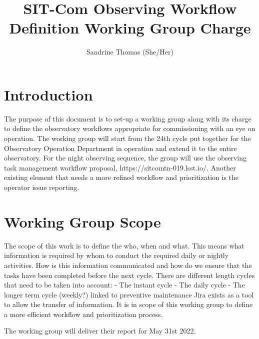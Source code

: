\documentclass[SE,authoryear,toc]{lsstdoc}
\title{SIT-Com Observing Workflow Definition Working Group Charge}
\author{%
Sandrine Thomas (She/Her)
}
\date{\vcsDate}
\begin{document}
\maketitle



\section{Introduction}
The purpose of this document is to set-up a working group along with its charge to define the observatory workflows appropriate for commissioning with an eye on operation. The working group will start from the 24th cycle put together for the Observatory Operation Department in operation and extend it to the entire observatory. 
For the night observing sequence, the group will use the observing task management workflow proposal, https://sitcomtn-019.lsst.io/. 
Another existing element that needs a more refined workflow and prioritization is the operator issue reporting.

\section{Working Group Scope}
The scope of this work is to define the who, when and what. This means what information is required by whom to conduct the required daily or nightly activities. How is this information communicated and how do we ensure that the tasks have been completed before the next cycle. 
There are different length cycles that need to be taken into account: 
- The instant cycle 
- The daily cycle
- The longer term cycle (weekly?) linked to preventive maintenance
Jira exists as a tool to allow the transfer of information. It is in scope of this working group to define a more efficient workflow and prioritization process. 

The working group will deliver their report for May 31st 2022.
\end{document}
